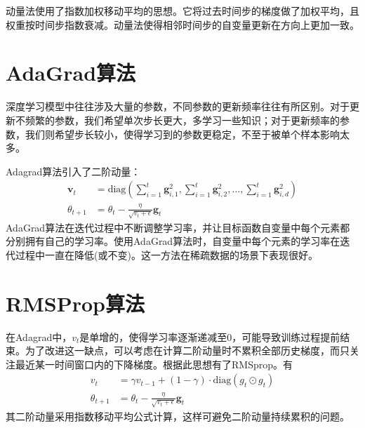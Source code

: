 动量法使用了指数加权移动平均的思想。它将过去时间步的梯度做了加权平均，且权重按时间步指数衰减。动量法使得相邻时间步的自变量更新在方向上更加一致。
\section{AdaGrad算法}
深度学习模型中往往涉及大量的参数，不同参数的更新频率往往有所区别。对于更新不频繁的参数，我们希望单次步长更大，多学习一些知识；对于更新频率的参数，我们则希望步长较小，使得学习到的参数更稳定，不至于被单个样本影响太多。

Adagrad算法引入了二阶动量：
\begin{equation}
	\begin{aligned}
		\boldsymbol{v}_t&=\mathrm{diag}(\sum_{i=1}^{t}\boldsymbol{g}_{i,1}^2, \sum_{i=1}^{t}\boldsymbol{g}_{i,2}^2, \dots, \sum_{i=1}^{t}\boldsymbol{g}_{i,d}^2)\\
		\theta_{t+1} &= \theta_{t} - \frac{\eta}{\sqrt{v_t + \epsilon}}\boldsymbol{g}_t
	\end{aligned}
\end{equation}
AdaGrad算法在迭代过程中不断调整学习率，并让目标函数自变量中每个元素都分别拥有自己的学习率。使用AdaGrad算法时，自变量中每个元素的学习率在迭代过程中一直在降低(或不变)。这一方法在稀疏数据的场景下表现很好。
\section{RMSProp算法}
在Adagrad中，$v_t$是单增的，使得学习率逐渐递减至0，可能导致训练过程提前结束。为了改进这一缺点，可以考虑在计算二阶动量时不累积全部历史梯度，而只关注最近某一时间窗口内的下降梯度。根据此思想有了RMSprop。有
\begin{equation}
	\begin{aligned}
		v_t &= \gamma v_{t-1} + (1-\gamma)\cdot \mathrm{diag}(g_t \odot g_t)\\
		\theta_{t+1} &= \theta_{t} - \frac{\eta}{\sqrt{v_t + \epsilon}}\boldsymbol{g}_t
	\end{aligned}
\end{equation}
其二阶动量采用指数移动平均公式计算，这样可避免二阶动量持续累积的问题。
